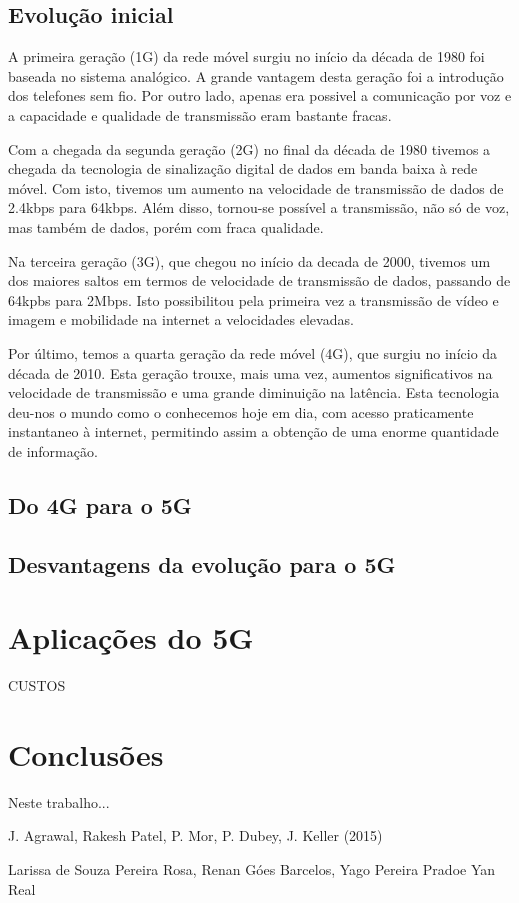 \documentclass{llncs}
\begin{document}
\subsection{Evolução inicial}

A primeira geração (1G) da rede móvel surgiu no início da década de 1980 foi baseada no sistema analógico. A grande vantagem desta geração foi a introdução dos telefones sem fio. Por outro lado, apenas era possivel a comunicação por voz e a capacidade e qualidade de transmissão eram bastante fracas.

Com a chegada da segunda geração (2G) no final da década de 1980 tivemos a chegada da tecnologia de sinalização digital de dados em banda baixa à rede móvel. Com isto, tivemos um aumento na velocidade de transmissão de dados de 2.4kbps para 64kbps. Além disso, tornou-se possível a transmissão, não só de voz, mas também de dados, porém com fraca qualidade.

Na terceira geração (3G), que chegou no início da decada de 2000, tivemos um dos maiores saltos em termos de velocidade de transmissão de dados, passando de 64kpbs para 2Mbps. Isto possibilitou pela primeira vez a transmissão de vídeo e imagem e mobilidade na internet a velocidades elevadas.

Por último, temos a quarta geração da rede móvel (4G), que surgiu no início da década de 2010. Esta geração trouxe, mais uma vez, aumentos significativos na velocidade de transmissão e uma grande diminuição na latência. Esta tecnologia deu-nos o mundo como o conhecemos hoje em dia, com acesso praticamente instantaneo à internet, permitindo assim a obtenção de uma enorme quantidade de informação.

\clearpage

\subsection{Do 4G para o 5G}

\subsection{Desvantagens da evolução para o 5G}

\section{Aplicações do 5G}

CUSTOS

\section{Conclusões}
Neste trabalho...

\begin{thebibliography}{1}
\bibitem{}
J. Agrawal, Rakesh Patel, P. Mor, P. Dubey, J. Keller
 (2015)

\bibitem{}
Larissa de Souza Pereira Rosa, Renan Góes Barcelos, Yago Pereira Pradoe Yan Real
\end{thebibliography}
\end{document}
